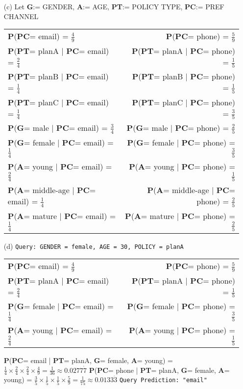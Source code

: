 \documentclass[10pt,a4paper]{article}
\newcommand{\p}{\textbf{P}}
\newcommand{\g}{\textbf{G}}
\newcommand{\ag}{\textbf{A}}
\newcommand{\pt}{\textbf{PT}}
\newcommand{\pc}{\textbf{PC}}
\begin{document}
\begin{enumerate}
		
		\newpage
		\item[(c)] Let \g := GENDER, \ag := AGE, \pt := POLICY TYPE, \pc := PREF CHANNEL
			\begin{table}[h!]
				\begin{tabular}{l|r}
					\toprule
					\p(\pc = email) = $\frac{4}{9}$ & \p(\pc = phone) = $\frac{5}{9}$ \\
					\p(\pt = planA | \pc = email) = $\frac{2}{4}$ & \p(\pt = planA | \pc = phone) = $\frac{1}{5}$ \\
					\p(\pt = planB | \pc = email) = $\frac{1}{4}$ & \p(\pt = planB | \pc = phone) = $\frac{1}{5}$ \\
					\p(\pt = planC | \pc = email) = $\frac{1}{4}$ & \p(\pt = planC | \pc = phone) = $\frac{3}{5}$ \\
					\p(\g = male | \pc = email) = $\frac{3}{4}$ & \p(\g = male | \pc = phone) = $\frac{2}{5}$ \\
					\p(\g = female | \pc = email) = $\frac{1}{4}$ & \p(\g = female | \pc = phone) = $\frac{3}{5}$ \\
					\p(\ag = young | \pc = email) = $\frac{2}{4}$ & \p(\ag = young | \pc = phone) = $\frac{1}{5}$ \\
					\p(\ag = middle-age | \pc = email) = $\frac{1}{4}$ & \p(\ag = middle-age | \pc = phone) = $\frac{2}{5}$ \\
					\p(\ag = mature | \pc = email) = $\frac{1}{4}$ & \p(\ag = mature | \pc = phone) = $\frac{2}{5}$ \\
					\bottomrule
				\end{tabular}
			\end{table}
		
		\item[(d)] \texttt{Query: GENDER = female, AGE = 30, POLICY = planA}
		\begin{table}[h!]
			\begin{tabular}{l|r}
				\toprule
				\p(\pc = email) = $\frac{4}{9}$ & \p(\pc = phone) = $\frac{5}{9}$ \\
				\p(\pt = planA | \pc = email) = $\frac{2}{4}$ & \p(\pt = planA | \pc = phone) = $\frac{1}{5}$ \\
				\p(\g = female | \pc = email) = $\frac{1}{4}$ & \p(\g = female | \pc = phone) = $\frac{3}{5}$ \\
				\p(\ag = young | \pc = email) = $\frac{2}{4}$ & \p(\ag = young | \pc = phone) = $\frac{1}{5}$ \\
				\bottomrule
			\end{tabular}
		\end{table}
	
		\p(\pc = email | \pt = planA, \g = female, \ag = young) = $ \frac{1}{4} \times \frac{2}{4} \times \frac{2}{4} \times \frac{4}{9} = \frac{1}{36} \approx 0.0277\dot{7} $ \newline
		\p(\pc = phone | \pt = planA, \g = female, \ag = young) = $ \frac{3}{5} \times \frac{1}{5} \times \frac{1}{5} \times \frac{5}{9} = \frac{1}{75} \approx 0.0133\dot{3} $ \newline \newline
		\texttt{Query Prediction: "email"}
	
	\end{enumerate}
	
\end{document}
